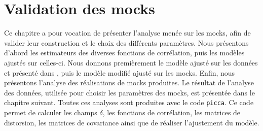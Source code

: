 
% 

% 


\graphicspath{ {../figures/mocks_ana/} }

\chapter{Validation des mocks}
\label{chap:mock_ana}
\minitoc
\newpage
\thispagestyle{fancy}


Ce chapitre a pour vocation de présenter l'analyse menée sur les mocks, afin de valider leur construction et le choix des différents paramètres.
Nous présentons d'abord les estimateurs des diverses fonctions de corrélation, puis les modèles ajustés sur celles-ci.
Nous donnons premièrement le modèle ajusté sur les données et présenté dans \textcite{DuMasdesBourboux2020}, puis le modèle modifié ajusté sur les mocks.
Enfin, nous présentons l'analyse des \Nmocks{} réalisations de mocks produites. Le résultat de l'analyse des données, utilisée pour choisir les paramètres \lya{} des mocks, est présentée dans le chapitre suivant.
Toutes ces analyses sont produites avec le code \texttt{picca}. Ce code permet de calculer les champs $\delta$, les fonctions de corrélation, les matrices de distorsion, les matrices de covariance ainsi que de réaliser l'ajustement du modèle.

